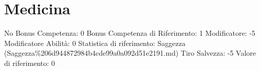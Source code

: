 \section{Medicina}\label{medicina}

\begin{description}
\tightlist
\item[Tags: ABI]
No Bonus Competenza: 0 Bonus Competenza di Riferimento: 1 Modificatore:
-5 Modificatore Abilità: 0 Statistica di riferimento: Saggezza
(Saggezza\%206d944872984b4cde99a0a092d51e2191.md) Tiro Salvezza: -5
Valore di riferimento: 0
\end{description}
